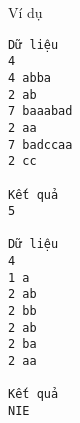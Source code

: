 Ví dụ
\begin{verbatim}
Dữ liệu
4
4 abba
2 ab
7 baaabad
2 aa
7 badccaa
2 cc

Kết quả
5

Dữ liệu
4
1 a
2 ab
2 bb
2 ab
2 ba
2 aa

Kết quả
NIE
\end{verbatim}